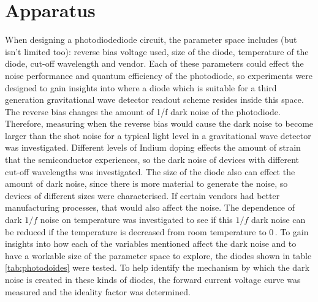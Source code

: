 \section{Apparatus}
When designing a photodiodediode circuit, the parameter space includes (but isn't limited too): reverse bias voltage used, size of the diode, temperature of the diode, cut-off wavelength and vendor. Each of these parameters could effect the noise performance and quantum efficiency of the photodiode, so experiments were designed to gain insights into where a diode which is suitable for a third generation gravitational wave detector readout scheme resides inside this space. The reverse bias  changes the amount of 1/f dark noise of the photodiode. Therefore, measuring when the reverse bias would cause the dark noise to become larger than the shot noise for a typical light level in a gravitational wave detector was investigated. Different levels of Indium doping effects the amount of strain that the semiconductor experiences, so the dark noise of devices with different cut-off wavelengths was investigated. The size of the diode also can effect the amount of dark noise, since there is more material to generate the noise, so devices of different sizes were characterised. If certain vendors had better manufacturing processes, that would also affect the noise. The dependence of dark $1/f$ noise on temperature was investigated to see if this $1/f$ dark noise can be reduced if the temperature is decreased from room temperature to 0\,. To gain insights into how each of the variables mentioned affect the dark noise and to have a workable size of the parameter space to explore, the diodes shown in table \ref{tab:photodoides} were tested. To help identify the mechanism by which the dark noise is created in these kinds of diodes, the forward current voltage curve was measured and the ideality factor was determined. 
